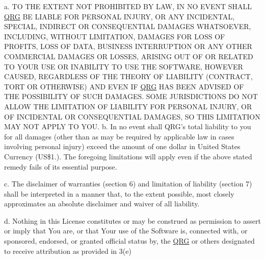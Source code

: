 a. TO THE EXTENT NOT PROHIBITED BY LAW, IN NO EVENT SHALL \mbox{\hyperlink{namespace_q_r_g}{QRG}} BE LIABLE FOR PERSONAL INJURY, OR ANY INCIDENTAL, SPECIAL, INDIRECT OR CONSEQUENTIAL DAMAGES WHATSOEVER, INCLUDING, WITHOUT LIMITATION, DAMAGES FOR LOSS OF PROFITS, LOSS OF DATA, BUSINESS INTERRUPTION OR ANY OTHER COMMERCIAL DAMAGES OR LOSSES, ARISING OUT OF OR RELATED TO YOUR USE OR INABILITY TO USE THE SOFTWARE, HOWEVER CAUSED, REGARDLESS OF THE THEORY OF LIABILITY (CONTRACT, TORT OR OTHERWISE) AND EVEN IF \mbox{\hyperlink{namespace_q_r_g}{QRG}} HAS BEEN ADVISED OF THE POSSIBILITY OF SUCH DAMAGES. SOME JURISDICTIONS DO NOT ALLOW THE LIMITATION OF LIABILITY FOR PERSONAL INJURY, OR OF INCIDENTAL OR CONSEQUENTIAL DAMAGES, SO THIS LIMITATION MAY NOT APPLY TO YOU. b. In no event shall QRG’s total liability to you for all damages (other than as may be required by applicable law in cases involving personal injury) exceed the amount of one dollar in United States Currency (US\$1.). The foregoing limitations will apply even if the above stated remedy fails of its essential purpose.

c. The disclaimer of warranties (section 6) and limitation of liability (section 7) shall be interpreted in a manner that, to the extent possible, most closely approximates an absolute disclaimer and waiver of all liability.

d. Nothing in this License constitutes or may be construed as permission to assert or imply that You are, or that Your use of the Software is, connected with, or sponsored, endorsed, or granted official status by, the \mbox{\hyperlink{namespace_q_r_g}{QRG}} or others designated to receive attribution as provided in 3(e)


